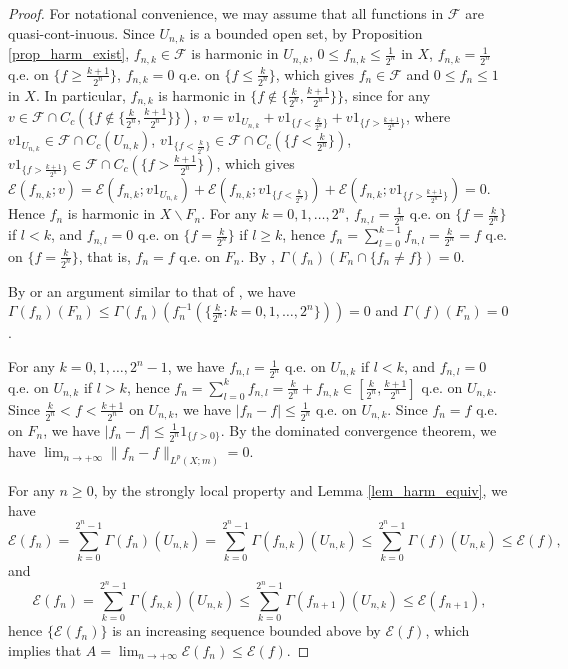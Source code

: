 \documentclass[11pt,a4paper]{article}
\numberwithin{equation}{section}
\theoremstyle{plain}
\theoremstyle{definition}
\begin{document}
\begin{proof}
For notational convenience, we may assume that all functions in $\mathcal{F}$ are quasi-cont-inuous. Since $U_{n,k}$ is a bounded open set, by Proposition \ref{prop_harm_exist}, $f_{n,k}\in\mathcal{F}$ is harmonic in $U_{n,k}$, $0\le f_{n,k}\le \frac{1}{2^n}$ in $X$, $f_{n,k}=\frac{1}{2^n}$ q.e. on $\{f\ge \frac{k+1}{2^n}\}$, $f_{n,k}=0$ q.e. on $\{f\le \frac{k}{2^n}\}$, which gives $f_n\in\mathcal{F}$ and $0\le f_n\le 1$ in $X$. In particular, $f_{n,k}$ is harmonic in $\{f\not\in\{\frac{k}{2^n},\frac{k+1}{2^n}\}\}$, since for any $v\in\mathcal{F}\cap C_c(\{f\not\in\{\frac{k}{2^n},\frac{k+1}{2^n}\}\})$, $v=v1_{U_{n,k}}+v1_{\{f<\frac{k}{2^n}\}}+v1_{\{f>\frac{k+1}{2^n}\}}$, where $v1_{U_{n,k}}\in\mathcal{F}\cap C_c(U_{n,k})$, $v1_{\{f<\frac{k}{2^n}\}}\in\mathcal{F}\cap C_c(\{f<\frac{k}{2^n}\})$, $v1_{\{f>\frac{k+1}{2^n}\}}\in\mathcal{F}\cap C_c(\{f>\frac{k+1}{2^n}\})$, which gives $\mathcal{E}(f_{n,k};v)=\mathcal{E}(f_{n,k};v1_{U_{n,k}})+\mathcal{E}(f_{n,k};v1_{\{f<\frac{k}{2^n}\}})+\mathcal{E}(f_{n,k};v1_{\{f>\frac{k+1}{2^n}\}})=0$. Hence $f_n$ is harmonic in $X\backslash F_n$. For any $k=0,1,\ldots,2^n$, $f_{n,l}=\frac{1}{2^n}$ q.e. on $\{f=\frac{k}{2^n}\}$ if $l<k$, and $f_{n,l}=0$ q.e. on $\{f=\frac{k}{2^n}\}$ if $l\ge k$, hence $f_n=\sum_{l=0}^{k-1}f_{n,l}=\frac{k}{2^n}=f$ q.e. on $\{f=\frac{k}{2^n}\}$, that is, $f_n=f$ q.e. on $F_n$. By \cite[Proposition 8.12]{Yan25a}, $\Gamma(f_n)(F_n\cap\{f_n\ne f\})=0$.

By \cite[Theorem 4.17, Theorem 4.18]{KS24a} or an argument similar to that of \cite[THEOREM 4.3.8]{CF12}, we have $\Gamma(f_n)(F_n)\le\Gamma(f_n)(f_n^{-1}(\{\frac{k}{2^n}:k=0,1,\ldots,2^n\}))=0$ and $\Gamma(f)(F_n)=0$.

For any $k=0,1,\ldots,2^n-1$, we have $f_{n,l}=\frac{1}{2^n}$ q.e. on $U_{n,k}$ if $l<k$, and $f_{n,l}=0$ q.e. on $U_{n,k}$ if $l>k$, hence $f_n=\sum_{l=0}^kf_{n,l}=\frac{k}{2^n}+f_{n,k}\in[\frac{k}{2^n},\frac{k+1}{2^n}]$ q.e. on $U_{n,k}$. Since $\frac{k}{2^n}<f< \frac{k+1}{2^n}$ on $U_{n,k}$, we have $|f_n-f|\le \frac{1}{2^n}$ q.e. on $U_{n,k}$. Since $f_n=f$ q.e. on $F_n$, we have $|f_n-f|\le \frac{1}{2^n}1_{\{f>0\}}$. By the dominated convergence theorem, we have $\lim_{n\to+\infty} \lVert {f_n-f}\rVert_{L^p(X;m)}=0$.

For any $n\ge0$, by the strongly local property and Lemma \ref{lem_harm_equiv}, we have
$$\mathcal{E}(f_n)=\sum_{k=0}^{2^n-1}\Gamma(f_n)(U_{n,k})=\sum_{k=0}^{2^n-1}\Gamma(f_{n,k})(U_{n,k})\le\sum_{k=0}^{2^n-1}\Gamma(f)(U_{n,k})\le\mathcal{E}(f),$$
and
$$\mathcal{E}(f_n)=\sum_{k=0}^{2^n-1}\Gamma(f_{n,k})(U_{n,k})\le\sum_{k=0}^{2^n-1}\Gamma(f_{n+1})(U_{n,k})\le\mathcal{E}(f_{n+1}),$$
hence $\{\mathcal{E}(f_n)\}$ is an increasing sequence bounded above by $\mathcal{E}(f)$, which implies that $A=\lim_{n\to+\infty}\mathcal{E}(f_n)\le\mathcal{E}(f)$.


\end{proof}
\end{document}
